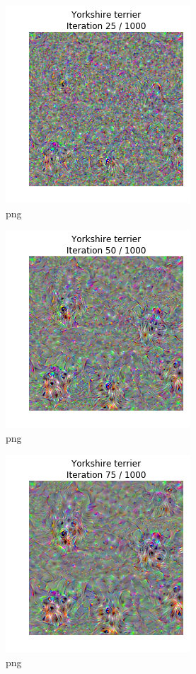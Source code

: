 \documentclass[]{book}
\theoremstyle{definition}
\theoremstyle{definition}
\theoremstyle{definition}
\theoremstyle{remark}
\begin{document}
\begin{figure}
\centering
\includegraphics{Network-Visualization-TensorFlow_files/Network-Visualization-TensorFlow_24_2.png}
\caption{png}
\end{figure}

\begin{figure}
\centering
\includegraphics{Network-Visualization-TensorFlow_files/Network-Visualization-TensorFlow_24_3.png}
\caption{png}
\end{figure}

\begin{figure}
\centering
\includegraphics{Network-Visualization-TensorFlow_files/Network-Visualization-TensorFlow_24_4.png}
\caption{png}
\end{figure}
\end{document}
